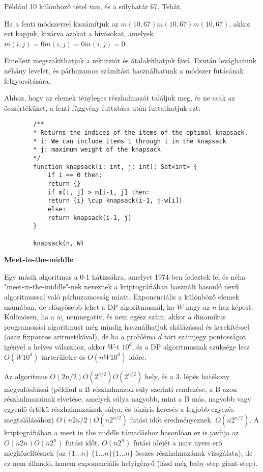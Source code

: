 	Például 10 különböző tétel van, és a súlyhatár 67. Tehát, 
	
	
	Ha a fenti módszerrel kiszámítjuk az $m ( 10 , 67 ) {\displaystyle m(10,67)} {\displaystyle m(10,67)}$, akkor ezt kapjuk, kizárva azokat a hívásokat, amelyek $m ( i , j ) = 0 {\displaystyle m(i,j)=0} {\displaystyle m(i,j)=0}$: 
	
	
	Emellett megszakíthatjuk a rekurziót és átalakíthatjuk fává. Ezután levághatunk néhány levelet, és párhuzamos számítást használhatunk a módszer futásának felgyorsítására.
	
	Ahhoz, hogy az elemek tényleges részhalmazát találjuk meg, és ne csak az összértéküket, a fenti függvény futtatása után futtathatjuk ezt:
	
	\begin{verbatim}
		/**
		* Returns the indices of the items of the optimal knapsack.
		* i: We can include items 1 through i in the knapsack
		* j: maximum weight of the knapsack
		*/
		function knapsack(i: int, j: int): Set<int> {
			if i == 0 then:
			return {}
			if m[i, j] > m[i-1, j] then:
			return {i} \cup knapsack(i-1, j-w[i])
			else:
			return knapsack(i-1, j)
		}
		
		knapsack(n, W)
	\end{verbatim}
	
	\textbf{Meet-in-the-middle}
	
	Egy másik algoritmus a 0-1 hátizsákra, amelyet 1974-ben fedeztek fel és néha "meet-in-the-middle"-nek neveznek a kriptográfiában használt hasonló nevű algoritmussal való párhuzamosság miatt. Exponenciális a különböző elemek számában, de előnyösebb lehet a DP algoritmusnál, ha $W$ nagy az $n$-hez képest.  Különösen, ha a $w_i$ nemnegatív, és nem egész szám, akkor a dinamikus programozási algoritmust még mindig használhatjuk skálázással és kerekítéssel (azaz fixpontos aritmetikával), de ha a probléma $d$ tört számjegy pontosságot igényel a helyes válaszhoz, akkor $W$-t $10^d$, és a DP algoritmusnak szüksége lesz $O(W10^d)$ tárterületre és $O(nW10^d)$ időre.
	
	Az algoritmus 
	$O ( 2 n / 2 ) {\displaystyle O(2^{n/2})} O(2^{n/2})$
	hely, és a 3. lépés hatékony megvalósításai (például a B részhalmazok súly szerinti rendezése, a B azon részhalmazainak elvetése, amelyek súlya nagyobb, mint a B más, nagyobb vagy egyenlő értékű részhalmazainak súlya, és bináris keresés a legjobb egyezés megtalálásához) 
	$O ( n 2 n / 2 ) {\displaystyle O(n2^{n/2})}$
	futási időt eredményeznek. 
	${\displaystyle O(n2^{n/2})}$. 
	A kriptográfiában a meet in the middle támadáshoz hasonlóan ez is javítja az $
	O ( n 2 n ) {\displaystyle O(n2^{n})}$ 
	futási időt. 
	$O(n2^{n})$ 
	futási idejét a naiv nyers erő megközelítésnek (az 
	$\{ 1 ... n \} $
	${\displaystyle \{1 ... n\}} \{1 ... n\}$ 
	összes részhalmazának vizsgálata), de ez nem állandó, hanem exponenciális helyigényű (lásd még baby-step giant-step).  
	
